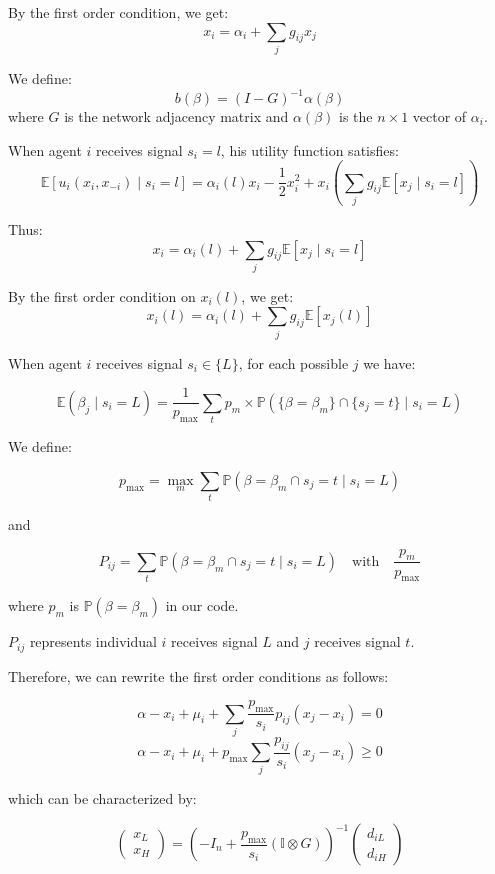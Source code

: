 \documentclass[12pt]{article}
\begin{document}
By the first order condition, we get:
\[
x_i = \alpha_i + \sum_j g_{ij} x_j
\]

We define:
\[
b(\beta) = (I - G)^{-1} \alpha(\beta)
\]
where $G$ is the network adjacency matrix and $\alpha(\beta)$ is the $n \times 1$ vector of $\alpha_i$.

When agent $i$ receives signal $s_i = l$, his utility function satisfies:
\[
\mathbb{E}[u_i(x_i, x_{-i}) \mid s_i = l] = \alpha_i(l) x_i - \frac{1}{2}x_i^2 + x_i \left( \sum_j g_{ij} \mathbb{E}[x_j \mid s_i = l] \right)
\]

Thus:
\[
x_i = \alpha_i(l) + \sum_j g_{ij} \mathbb{E}[x_j \mid s_i = l]
\]

By the first order condition on $x_i(l)$, we get:
\[
x_i(l) = \alpha_i(l) + \sum_j g_{ij} \mathbb{E}[x_j(l)]
\]

When agent $i$ receives signal $s_i \in \{L\}$, for each possible $j$ we have:

\[
\mathbb{E}(\beta_j \mid s_i = L) = \frac{1}{p_{\max}} \sum_{t} p_{m} \times \mathbb{P}(\{\beta = \beta_m\} \cap \{s_j = t\} \mid s_i = L)
\]

We define:

\[
p_{\max} = \max_{m} \sum_{t} \mathbb{P}(\beta = \beta_m \cap s_j = t \mid s_i = L)
\]

and

\[
P_{ij} = \sum_{t} \mathbb{P}(\beta = \beta_m \cap s_j = t \mid s_i = L)
\quad \text{with} \quad \frac{p_m}{p_{\max}}
\]

where $p_m$ is $\mathbb{P}(\beta = \beta_m)$ in our code.

$P_{ij}$ represents individual $i$ receives signal $L$ and $j$ receives signal $t$.

Therefore, we can rewrite the first order conditions as follows:

\[
\alpha - x_i + \mu_i + \sum_{j} \frac{p_{\max}}{s_i} p_{ij} (x_j - x_i) = 0
\]
\[
\alpha - x_i + \mu_i + p_{\max} \sum_{j} \frac{p_{ij}}{s_i} (x_j - x_i) \geq 0
\]

which can be characterized by:

\[
\begin{pmatrix}
x_L \\
x_H
\end{pmatrix}
= \left( -I_n + \frac{p_{\max}}{s_i} (\mathbb{I} \otimes G) \right)^{-1}
\begin{pmatrix}
d_{iL} \\
d_{iH}
\end{pmatrix}
\]
\end{document}
